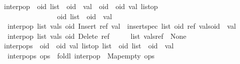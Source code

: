 \begin{isabelle}
\isamarkupfalse%
\ interp{\isacharunderscore}op\ {\isacharcolon}{\isacharcolon}\ {\isachardoublequoteopen}{\isacharparenleft}{\isacharprime}oid\ list\ {\isasymtimes}\ {\isacharparenleft}{\isacharprime}oid\ {\isasymrightharpoonup}\ {\isacharprime}val{\isacharparenright}{\isacharparenright}\ {\isasymRightarrow}\ {\isacharparenleft}{\isacharprime}oid\ {\isasymtimes}\ {\isacharparenleft}{\isacharprime}oid{\isacharcomma}\ {\isacharprime}val{\isacharparenright}\ list{\isacharunderscore}op{\isacharparenright}\isanewline
\ \ \ \ \ \ \ \ \ \ \ \ \ \ \ {\isasymRightarrow}\ {\isacharparenleft}{\isacharprime}oid\ list\ {\isasymtimes}\ {\isacharparenleft}{\isacharprime}oid\ {\isasymrightharpoonup}\ {\isacharprime}val{\isacharparenright}{\isacharparenright}{\isachardoublequoteclose}\ \isanewline
\ \ {\isachardoublequoteopen}interp{\isacharunderscore}op\ {\isacharparenleft}list{\isacharcomma}\ vals{\isacharparenright}\ {\isacharparenleft}oid{\isacharcomma}\ Insert\ ref\ val{\isacharparenright}\ {\isacharequal}\ {\isacharparenleft}insert{\isacharunderscore}spec\ list\ {\isacharparenleft}oid{\isacharcomma}\ ref{\isacharparenright}{\isacharcomma}\ vals{\isacharparenleft}oid\ {\isasymmapsto}\ val{\isacharparenright}{\isacharparenright}{\isachardoublequoteclose}\ {\isacharbar}\isanewline
\ \ {\isachardoublequoteopen}interp{\isacharunderscore}op\ {\isacharparenleft}list{\isacharcomma}\ vals{\isacharparenright}\ {\isacharparenleft}oid{\isacharcomma}\ Delete\ ref\ \ \ \ {\isacharparenright}\ {\isacharequal}\ {\isacharparenleft}list{\isacharcomma}\ vals{\isacharparenleft}ref\ {\isacharcolon}{\isacharequal}\ None{\isacharparenright}{\isacharparenright}{\isachardoublequoteclose}\isanewline
\isanewline
{}\isamarkupfalse%
\ interp{\isacharunderscore}ops\ {\isacharcolon}{\isacharcolon}\ {\isachardoublequoteopen}{\isacharparenleft}{\isacharprime}oid\ {\isasymtimes}\ {\isacharparenleft}{\isacharprime}oid{\isacharcomma}\ {\isacharprime}val{\isacharparenright}\ list{\isacharunderscore}op{\isacharparenright}\ list\ {\isasymRightarrow}\ {\isacharparenleft}{\isacharprime}oid\ list\ {\isasymtimes}\ {\isacharparenleft}{\isacharprime}oid\ {\isasymrightharpoonup}\ {\isacharprime}val{\isacharparenright}{\isacharparenright}{\isachardoublequoteclose}\isanewline
{}\isanewline
\ \ {\isachardoublequoteopen}interp{\isacharunderscore}ops\ ops\ {\isasymequiv}\ foldl\ interp{\isacharunderscore}op\ {\isacharparenleft}{\isacharbrackleft}{\isacharbrackright}{\isacharcomma}\ Map{\isachardot}empty{\isacharparenright}\ ops{\isachardoublequoteclose}%
\end{isabelle}


